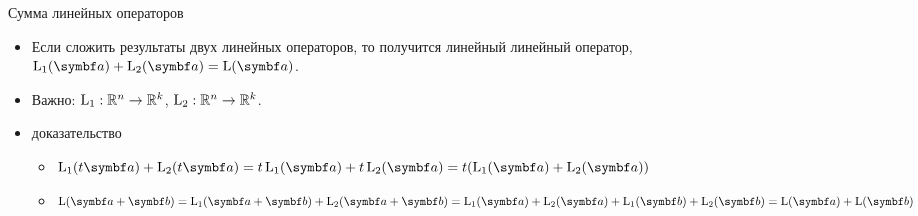 \begin{frame}{Сумма линейных операторов}




\begin{itemize}[<+->]
    \item Если сложить результаты двух линейных операторов, 
    то получится линейный линейный оператор, $\LL_1(\ba) + \LL_2(\ba) = \LL(\ba)$. 
\item Важно: $\operatorname{L}_1 : \mathbb{R}^n \to \mathbb{R}^k$, $\operatorname{L}_2 : \mathbb{R}^n \to \mathbb{R}^k$.
    \item \alert{доказательство}
\begin{itemize}
  \item $\LL_1(t\ba) + \LL_2(t\ba) = t\LL_1(\ba) + t\LL_2(\ba)=t(\LL_1(\ba) + \LL_2(\ba))$
  \item $\LL(\ba + \bb) = \LL_1(\ba + \bb) + \LL_2(\ba + \bb) = \LL_1(\ba ) + \LL_2(\ba ) + \LL_1( \bb) + \LL_2(\bb) = \LL(\ba) + \LL(\bb)$
\end{itemize}

\end{itemize}

    





\end{frame}

    